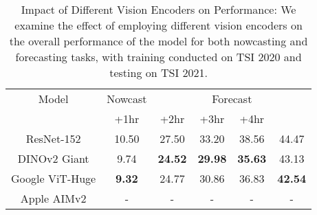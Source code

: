 

\begin{table}[H]
  \caption{Impact of Different Vision Encoders on Performance: We examine the effect of employing different vision encoders on the overall performance of the model for both nowcasting and forecasting tasks, with training conducted on TSI 2020 and testing on TSI 2021.}
  \label{tab:encoders_ablation}
  \centering
  \begin{tabular}{cccccc}
    \toprule
    Model & \multicolumn{1}{c}{Nowcast} & \multicolumn{4}{c}{Forecast} \\
    \cmidrule(lr){2-6}
    & +1hr & +2hr & +3hr & +4hr \\
    \midrule
    ResNet-152 & 10.50 & 27.50 & 33.20 & 38.56 & 44.47 \\
    DINOv2 Giant & 9.74 & \textbf{24.52} & \textbf{29.98} & \textbf{35.63} & 43.13 \\
    Google ViT-Huge & \textbf{9.32} & 24.77 & 30.86 & 36.83 & \textbf{42.54} \\
    Apple AIMv2 & - & - & - & - & - \\
    \bottomrule
  \end{tabular}
\end{table}



